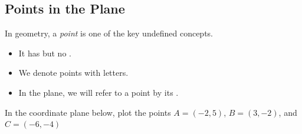 \subsection{Points in the Plane} 
In geometry, a \emph{point} is one of the key undefined concepts.
\begin{itemize}
\item It has \makeblank[1in] but no \makeblank[1in]. 
\item We denote points with \makeblank[1in] letters.
\item In the plane, we will refer to a point by its \makeblank[1.5in].
\end{itemize}
\begin{Example}
In the coordinate plane below, plot the points $A=(-2,5)$, $B=(3,-2)$, and $C=(-6,-4)$
\begin{icpic}[x=0.5\linespace,y=0.5\linespace]
\setgraphlarge
\GraphSmall
\end{icpic}
\end{Example}
